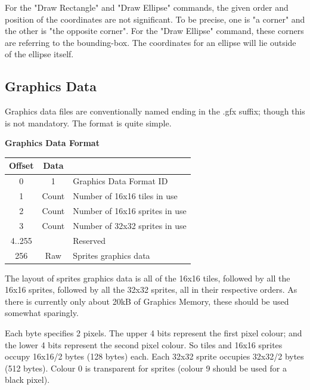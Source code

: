 \documentclass[12pt]{article}
\newcommand{\HeaderCenter}[1] {\makecell[tc]{\textbf{#1}}}
\begin{document}
For the "Draw Rectangle" and "Draw Ellipse" commands,
the given order and position of the coordinates are not significant.
To be precise, one is "a corner" and the other is "the opposite corner".
For the "Draw Ellipse" command, these corners are referring to the bounding-box.
The coordinates for an ellipse will lie outside of the ellipse itself.


\pagebreak


\subsection{Graphics Data}\label{subsec:graphics-data}

Graphics data files are conventionally named ending in the .gfx suffix;
though this is not mandatory.
The format is quite simple.

\begin{table}[h]
\centering\textbf{Graphics Data Format}                           \\
\begin{tabular}{ | c | c | l | }                                     \hline
\textbf{Offset} & \textbf{Data}  & \HeaderCenter{Description}     \\ \hline
0               & 1              & Graphics Data Format ID        \\ \hline
1               & Count          & Number of 16x16 tiles in use   \\ \hline
2               & Count          & Number of 16x16 sprites in use \\ \hline
3               & Count          & Number of 32x32 sprites in use \\ \hline
4..255          &                & Reserved                       \\ \hline
256             & Raw            & Sprites graphics data          \\ \hline
\end{tabular}
\end{table}

The layout of sprites graphics data is all of the 16x16 tiles,
followed by all the 16x16 sprites,
followed by all the 32x32 sprites, all in their respective orders.
As there is currently only about 20kB of Graphics Memory,
these should be used somewhat sparingly.
\newline

Each byte specifies 2 pixels. The upper 4 bits represent the first pixel colour;
and the lower 4 bits represent the second pixel colour.
So tiles and 16x16 sprites occupy 16x16/2 bytes (128 bytes) each.
Each 32x32 sprite occupies 32x32/2 bytes (512 bytes).
Colour 0 is transparent for sprites (colour 9 should be used for a black pixel).
\newline
\end{document}
